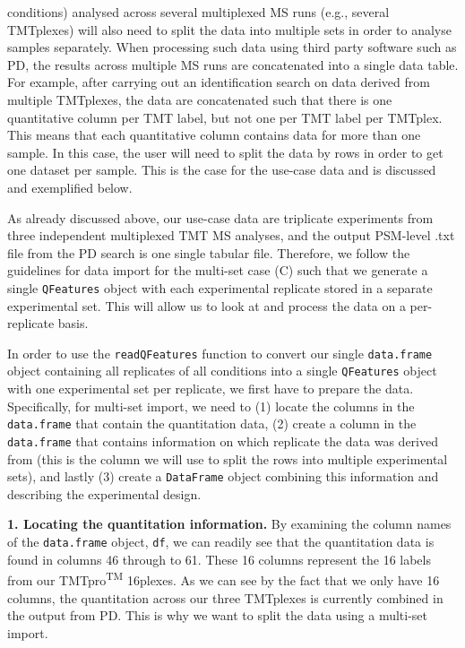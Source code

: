 \documentclass[9pt,a4paper,]{extarticle}
\begin{document}
\begin{enumerate}
  conditions) analysed across several multiplexed MS runs (e.g., several TMTplexes)
  will also need to split the data into multiple sets in order to analyse samples
  separately. When processing such data using third party software such as PD, the
  results across multiple MS runs are concatenated into a single data table. For
  example, after carrying out an identification search on data derived from multiple
  TMTplexes, the data are concatenated such that there is one quantitative column
  per TMT label, but not one per TMT label per TMTplex. This means that each quantitative
  column contains data for more than one sample. In this case, the user will need to
  split the data by rows in order to get one dataset per sample. This is the case
  for the use-case data and is discussed and exemplified below.
\end{enumerate}

As already discussed above, our use-case data are triplicate experiments from
three independent multiplexed TMT MS analyses, and the output PSM-level .txt file
from the PD search is one single tabular file. Therefore, we follow the guidelines
for data import for the multi-set case (C) such that we generate a single \texttt{QFeatures}
object with each experimental replicate stored in a separate experimental set.
This will allow us to look at and process the data on a per-replicate basis.

In order to use the \texttt{readQFeatures} function to convert our single \texttt{data.frame}
object containing all replicates of all conditions into a single \texttt{QFeatures} object
with one experimental set per replicate, we first have to prepare the data.
Specifically, for multi-set import, we need to (1) locate the columns in the \texttt{data.frame}
that contain the quantitation data, (2) create a column in the \texttt{data.frame} that
contains information on which replicate the data was derived from (this is the
column we will use to split the rows into multiple experimental sets), and
lastly (3) create a \texttt{DataFrame} object combining this information and describing
the experimental design.

\textbf{1. Locating the quantitation information.}
By examining the column names of the \texttt{data.frame} object, \texttt{df}, we can readily
see that the quantitation data is found in columns 46 through to 61. These 16
columns represent the 16 labels from our TMTpro\textsuperscript{TM} 16plexes. As we can see by
the fact that we only have 16 columns, the quantitation across our three TMTplexes
is currently combined in the output from PD. This is why we want to split the data
using a multi-set import.
\end{document}
